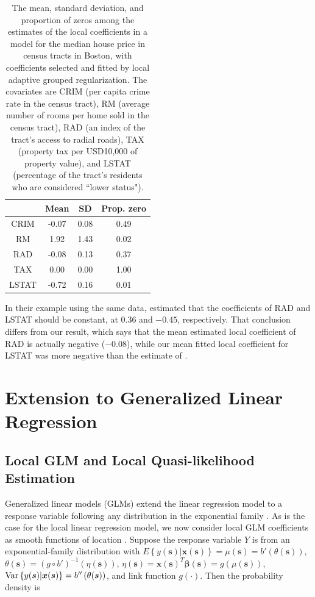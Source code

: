 \documentclass[authoryear,review, 12pt]{elsarticle}
\begin{document}
\begin{table}
\centering
\begin{tabular}{|c|ccc|}
  \hline
 & Mean & SD & Prop. zero \\ 
  \hline
CRIM & -0.07 & 0.08 & 0.49 \\ 
  RM & 1.92 & 1.43 & 0.02 \\ 
  RAD & -0.08 & 0.13 & 0.37 \\ 
  TAX & 0.00 & 0.00 & 1.00 \\ 
  LSTAT & -0.72 & 0.16 & 0.01 \\ 
   \hline
\end{tabular}
\caption{The mean, standard deviation, and proportion of zeros among the estimates of the local coefficients in a model for the median house price in census tracts in Boston, with coefficients selected and fitted by local adaptive grouped regularization. The covariates are CRIM (per capita crime rate in the census tract), RM (average number of rooms per home sold in the census tract), RAD (an index of the tract's access to radial roads), TAX (property tax per USD10,000 of property value), and LSTAT (percentage of the tract's residents who are considered ``lower status").} 
\label{tab:boston-coefs-lagr}
\end{table}


In their example using the same data, \citet{Sun-Yan-Zhang-Lu-2014}
estimated that the coefficients of RAD and LSTAT should be constant,
at $0.36$ and $-0.45$, respectively. That conclusion differs from
our result, which says that the mean estimated local coefficient of
RAD is actually negative (\ensuremath{-0.08}),
while our mean fitted local coefficient for LSTAT was more negative
than the estimate of \citet{Sun-Yan-Zhang-Lu-2014}.


\section{Extension to Generalized Linear Regression\label{sec:lagr-gllm}}


\subsection{Local GLM and Local Quasi-likelihood Estimation}

Generalized linear models (GLMs) extend the linear regression model
to a response variable following any distribution in the exponential
family \citep{McCullagh-Nelder-1989}. As is the case for the local
linear regression model, we now consider local GLM coefficients as
smooth functions of location \citep{Cai-Fan-Li-2000}. Suppose the
response variable $Y$ is from an exponential-family distribution
with $E\left\{ y(\bm{s})|\bm{x}(\bm{s})\right\} =\mu(\bm{s})=b'\left(\theta(\bm{s})\right)$,
$\theta(\bm{s})=(g\circ b')^{-1}\left(\eta(\bm{s})\right)$, $\eta(\bm{s})=\bm{x}(\bm{s})^{T}\bm{\beta}(\bm{s})=g\left(\mu(\bm{s})\right)$,
$\text{\text{Var}}\left\{ y(\bm{s})|\bm{x}(\bm{s})\right\} =b''\left(\theta(\bm{s})\right)$,
and link function $g(\cdot)$. Then the probability density is 
\end{document}
